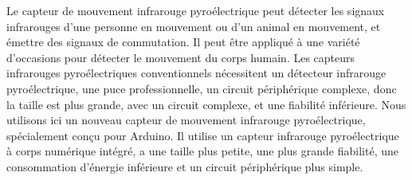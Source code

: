 \documentclass[a4paper, 11pt]{article}           %
\begin{document}
Le capteur de mouvement infrarouge pyroélectrique peut détecter les signaux infrarouges d'une personne en mouvement ou d'un animal en mouvement, et émettre des signaux de commutation. Il peut être appliqué à une variété d'occasions pour détecter le mouvement du corps humain. Les capteurs infrarouges pyroélectriques conventionnels nécessitent un détecteur infrarouge pyroélectrique, une puce professionnelle, un circuit périphérique complexe, donc la taille est plus grande, avec un circuit complexe, et une fiabilité inférieure. Nous utilisons ici un nouveau capteur de mouvement infrarouge pyroélectrique, spécialement conçu pour Arduino. Il utilise un capteur infrarouge pyroélectrique à corps numérique intégré, a une taille plus petite, une plus grande fiabilité, une consommation d'énergie inférieure et un circuit périphérique plus simple.
\end{document}
